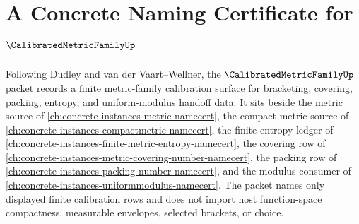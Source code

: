 \chapter{A Concrete Naming Certificate for $\CalibratedMetricFamilyUp$}
\label{ch:concrete-instances-calibrated-metric-family-namecert}

Following Dudley and van der Vaart--Wellner, the $\CalibratedMetricFamilyUp$ packet records a finite metric-family calibration surface for bracketing, covering, packing, entropy, and uniform-modulus handoff data. It sits beside the metric source of \autoref{ch:concrete-instances-metric-namecert}, the compact-metric source of \autoref{ch:concrete-instances-compactmetric-namecert}, the finite entropy ledger of \autoref{ch:concrete-instances-finite-metric-entropy-namecert}, the covering row of \autoref{ch:concrete-instances-metric-covering-number-namecert}, the packing row of \autoref{ch:concrete-instances-packing-number-namecert}, and the modulus consumer of \autoref{ch:concrete-instances-uniformmodulus-namecert}. The packet names only displayed finite calibration rows and does not import host function-space compactness, measurable envelopes, selected brackets, or choice.

